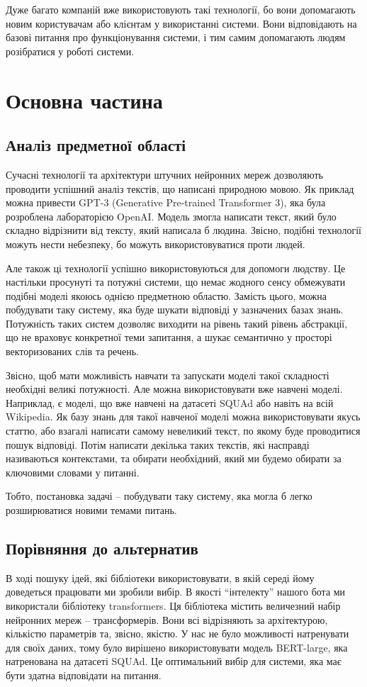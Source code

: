 \documentclass[a4paper,14pt]{extreport}
\newcommand\chap[1]{%
  \chapter*{#1}%
  \addcontentsline{toc}{chapter}{\uppercase{#1}}}
\begin{document}
    Дуже багато компаній вже використовують такі технології, бо вони допомагають новим користувачам або клієнтам у використанні системи. Вони відповідають на базові питання про функціонування системи, і тим самим допомагають людям розібратися у роботі системи. 

\chap{Основна частина}
\section{Аналіз предметної області}
    Сучасні технології та архітектури штучних нейронних мереж дозволяють проводити успішний аналіз текстів, що написані природною мовою. Як приклад можна привести GPT-3 (Generative Pre-trained Transformer 3), яка була розроблена лабораторією OpenAI. Модель змогла написати текст, який було складно відрізнити від тексту, який написала б людина. Звісно, подібні технології можуть нести небезпеку, бо можуть використовуватися проти людей.

    Але також ці технології успішно використовуються для допомоги людству. Це настільки просунуті та потужні системи, що немає жодного сенсу обмежувати подібні моделі якоюсь однією предметною областю. Замість цього, можна побудувати таку систему, яка буде шукати відповіді у зазначених базах знань. Потужність таких систем дозволяє виходити на рівень такий рівень абстракції, що не враховує конкретної теми запитання, а шукає семантично у просторі векторизованих слів та речень.

    Звісно, щоб мати можливість навчати та запускати моделі такої складності необхідні великі потужності. Але можна використовувати вже навчені моделі. Наприклад, є моделі, що вже навчені на датасеті SQUAd або навіть на всій Wikipedia. Як базу знань для такої навченої моделі можна використовувати якусь статтю, або взагалі написати самому невеликий текст, по якому буде проводитися пошук відповіді. Потім написати декілька таких текстів, які насправді називаються контекстами, та обирати необхідний, який ми будемо обирати за ключовими словами у питанні.

    Тобто, постановка задачі -- побудувати таку систему, яка могла б легко розширюватися новими темами питань.

\section{Порівняння до альтернатив}
    В ході пошуку ідей, які бібліотеки використовувати, в якій середі йому доведеться працювати ми зробили вибір. В якості ``інтелекту'' нашого бота ми використали бібліотеку transformers. Ця бібліотека містить величезний набір нейронних мереж -- трансформерів. Вони всі відрізняють за архітектурою, кількістю параметрів та, звісно, якістю. У нас не було можливості натренувати для своїх даних, тому було вирішено використовувати модель BERT-large, яка натренована на датасеті SQUAd. Це оптимальний вибір для системи, яка має бути здатна відповідати на питання.
\end{document}
